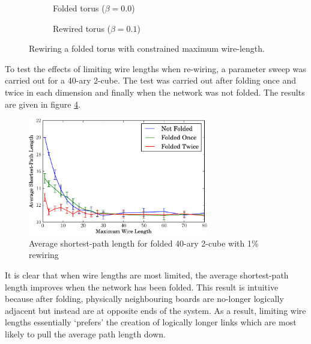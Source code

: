 			\begin{figure}
				\center
				\begin{subfigure}[t]{0.45\textwidth}
					\center
					
					\caption{Folded torus ($\beta=0.0$)}
					\label{fig:torusNetworkFB0}
				\end{subfigure}
				\begin{subfigure}[t]{0.45\textwidth}
					\center
					
					\caption{Rewired torus ($\beta=0.1$)}
					\label{fig:torusNetworkFB01}
				\end{subfigure}
				
				\caption{Rewiring a folded torus with constrained maximum wire-length.}
				\label{fig:torusNetworkF}
			\end{figure}
			
			To test the effects of limiting wire lengths when re-wiring, a parameter
			sweep was carried out for a 40-ary 2-cube. The test was carried out after
			folding once and twice in each dimension and finally when the
			network was not folded. The results are given in figure
			\ref{fig:smallWorldLimitedWiring}.
			
			\begin{figure}
				\center
				\includegraphics[width=0.7\textwidth]{figures/smallWorldLimitedWiring}
				\caption{Average shortest-path length for folded 40-ary 2-cube with 1\% rewiring}
				\label{fig:smallWorldLimitedWiring}
			\end{figure}
			
			It is clear that when wire lengths are most limited, the average
			shortest-path length improves when the network has been folded. This
			result is intuitive because after folding, physically neighbouring boards
			are no-longer logically adjacent but instead are at opposite ends of the
			system. As a result, limiting wire lengths essentially `prefers' the
			creation of logically longer links which are most likely to pull the
			average path length down.
			
